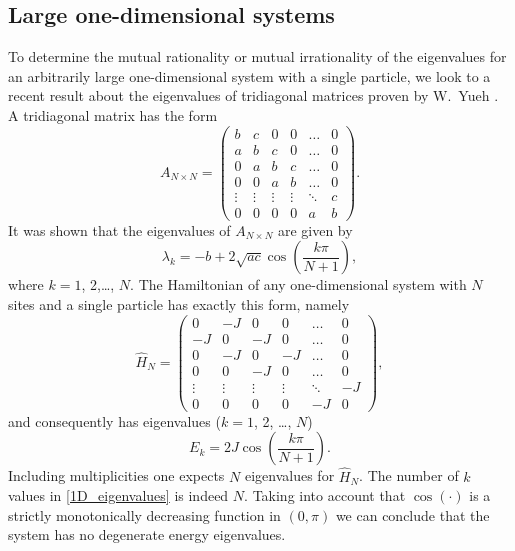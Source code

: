 \documentclass[prb, twocolumn, final]{revtex4-1}
\theoremstyle{plain}
\begin{document}
\subsection{Large one-dimensional systems}

To determine the mutual rationality or mutual irrationality of the eigenvalues
for an arbitrarily large one-dimensional system with a single particle, we look
to a recent result about the eigenvalues of tridiagonal matrices proven by
W.~Yueh \cite{Yueh2006}. A tridiagonal matrix has the form
\begin{equation}
    A_{N \times N}
    =
    \begin{pmatrix}
             b &      c &     0  &      0 &  \dots & 0 \\
             a &      b &     c  &      0 &  \dots & 0 \\
             0 &      a &     b  &      c &  \dots & 0 \\
             0 &      0 &     a  &      b &  \dots & 0 \\
        \vdots & \vdots & \vdots & \vdots & \ddots & c \\
             0 &      0 &     0  &      0 &      a & b
    \end{pmatrix}.
\end{equation}
It was shown that the eigenvalues of $A_{N \times N}$ are given by
\begin{equation}
    \label{tridiagonal_eigenvalues_formula}
    \lambda_{k} = -b + 2 \sqrt{ac} \cos{\!\left( \frac{k \pi}{N+1} \right )},
\end{equation}
where $k=1$, 2,\dots, $N$. The Hamiltonian of any one-dimensional system with
$N$ sites and a single particle has exactly this form, namely
\begin{equation}
    \hat{H}_{N}
    =
    \begin{pmatrix}
         0 &     -J &     0  &      0 &  \dots &  0 \\
        -J &      0 &    -J  &      0 &  \dots &  0 \\
         0 &     -J &     0  &     -J &  \dots &  0 \\
         0 &      0 &    -J  &      0 &  \dots &  0 \\
    \vdots & \vdots & \vdots & \vdots & \ddots & -J \\
         0 &      0 &     0  &      0 &     -J &  0
    \end{pmatrix},
\end{equation}
and consequently has eigenvalues ($k=1$, 2, \dots, $N$)
\begin{equation}
    \label{1D_eigenvalues}
    E_{k} = 2 J \cos{\!\left( \frac{k \pi}{N+1} \right)}.
\end{equation}
Including multiplicities one expects $N$ eigenvalues for $\hat{H}_{N}$. The
number of $k$ values in \eqref{1D_eigenvalues} is indeed $N$. Taking into
account that $\cos{\!(\cdot)}$ is a strictly monotonically decreasing function
in $(0, \pi)$ we can conclude that the system has no degenerate energy
eigenvalues.
\end{document}
